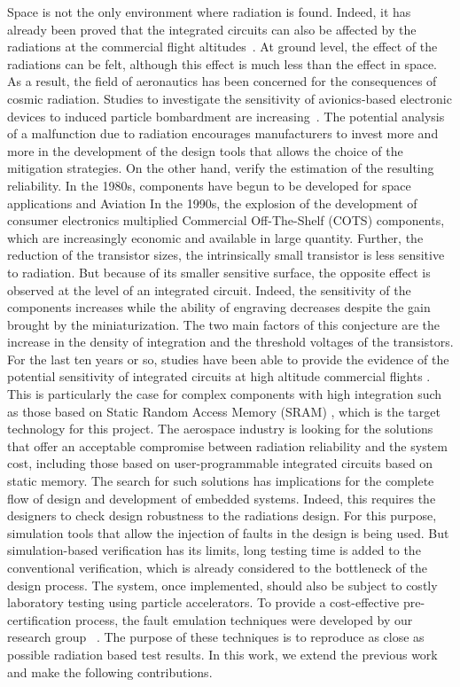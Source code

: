 Space is not the only environment where radiation is found. Indeed, it has already been proved that the integrated circuits can also be affected by the radiations at the commercial flight altitudes~\cite{normand1996single}. At ground level, the effect of the radiations can be felt, although this effect is much less than the effect in space\cite{normand2004single}. As a result, the field of aeronautics has been concerned for the consequences of cosmic radiation. Studies to investigate the sensitivity of avionics-based electronic devices to induced particle bombardment are increasing~\cite{bagshaw2008cosmic}.
The potential analysis of a malfunction due to radiation encourages manufacturers to invest more and more in the development of the design tools that allows the choice of the mitigation strategies. On the other hand, verify the estimation of the resulting reliability. In the 1980s,
components have begun to be developed for space applications and Aviation
In the 1990s, the explosion of the development of consumer electronics multiplied
Commercial Off-The-Shelf (COTS) components, which are increasingly
economic and available in large quantity. Further,  the reduction
of the transistor sizes, the intrinsically small transistor is less sensitive to
radiation. But because of its smaller sensitive surface, the opposite effect is observed at the level of an integrated circuit. Indeed, the sensitivity of the components increases while the ability of
engraving decreases despite the gain brought by the miniaturization. The two main factors
of this conjecture are the increase in the density of integration and the
threshold voltages of the transistors. For the last ten years or so, studies have been able to provide the evidence of the potential sensitivity of integrated circuits at high altitude commercial flights \cite{normand1998extensions}. This is particularly the case for complex components with high integration such as
those based on Static Random Access Memory (SRAM) \cite{baumann2005radiation}, which is the target technology for this project. The aerospace industry is looking for the solutions that offer an acceptable compromise between radiation reliability and the system cost, including those based on user-programmable integrated circuits based on static memory. The search for such solutions has implications for the complete flow of design and development of embedded systems. Indeed, this requires the designers to check design robustness to the radiations design. For this purpose, simulation tools that allow the injection of faults in the design is being used. But simulation-based verification has its limits, long testing time is added to the conventional verification, which is already considered to the bottleneck of the design process. The system, once implemented, should also be subject to costly laboratory testing using particle accelerators. To provide a cost-effective pre-certification process, the fault emulation techniques were developed by our research group ~\cite{hobeika2014multi,  bocquillon2009evaluation,souari2015optimization}. The purpose of these techniques is to reproduce as close as possible radiation based test results. In this work, we extend the previous work and make the following contributions. \\
